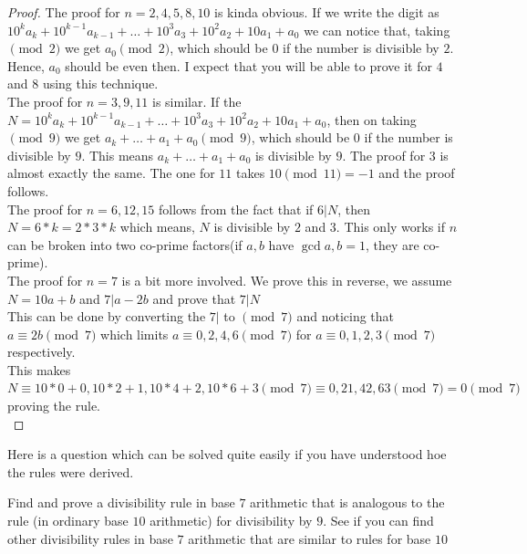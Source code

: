\begin{proof}
    The proof for $n=2,4,5,8,10$ is kinda obvious. If we write the digit as $10^k a_k+10^{k-1} a_{k-1}+\dots+10^3 a_3+10^2 a_2+10 a_1+a_0$ we can notice that, taking $\pmod{2}$ we get $a_0 \pmod{2}$, which should be $0$ if the number is divisible by $2$. Hence, $a_0$ should be even then. I expect that you will be able to prove it for $4$ and $8$ using this technique.\\
    The proof for $n=3,9,11$ is similar. If the $N=10^k a_k+10^{k-1} a_{k-1}+\dots+10^3 a_3+10^2 a_2+10 a_1+a_0$, then on taking $\pmod{9}$ we get $a_k+\dots+a_1+a_0 \pmod{9}$, which should be $0$ if the number is divisible by $9$. This means $a_k+\dots+a_1+a_0$ is divisible by $9$. The proof for $3$ is almost exactly the same. The one for $11$ takes $10 \pmod{11}=-1$ and the proof follows.\\
    The proof for $n=6,12,15$ follows from the fact that if $6|N$, then $N=6*k=2*3*k$ which means, $N$ is divisible by $2$ and $3$. This only works if $n$ can be broken into two co-prime factors(if $a,b$ have $\gcd{a,b}=1$, they are co-prime).\\
    The proof for $n=7$ is a bit more involved. We prove this in reverse, we assume $N=10a+b$ and $7 | a-2b$ and prove that $7 | N$\\
    This can be done by converting the $7|$ to $\pmod{7}$ and noticing that $a \equiv 2b \pmod{7}$ which limits $a \equiv 0,2,4,6 \pmod{7}$ for $a \equiv 0,1,2,3 \pmod{7}$ respectively.\\
    This makes $N \equiv 10*0+0, 10*2+1, 10*4+2, 10*6+3 \pmod{7} \equiv 0, 21, 42, 63 \pmod{7}= 0 \pmod{7}$ proving the rule.\\
\end{proof}
Here is a question which can be solved quite easily if you have understood hoe the rules were derived.\\
\begin{example}
    Find and prove a divisibility rule in base $7$ arithmetic that is analogous to the rule (in ordinary base $10$ arithmetic) for divisibility by $9$. See if you can find other divisibility rules in base $7$ arithmetic that are similar to rules for base $10$
\end{example}
